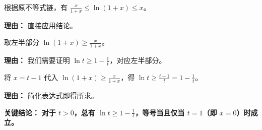 \begin{examplebox}
\begin{description}[style=nextline, leftmargin=2.8em, labelsep=0.5em, itemsep=0.45em]
    \item[\textbf{第二步（代入原式）：}] 根据原不等式链，有 $\frac{x}{1+x} \le \ln(1+x) \le x$。
    \par\textbf{理由：}
    直接应用结论。

    \item[\textbf{第三步（取下界部分）：}] 取左半部分 $\ln(1+x) \ge \frac{x}{1+x}$。
    \par\textbf{理由：}
    我们需要证明 $\ln t \ge 1 - \frac{1}{t}$，对应左半部分。

    \item[\textbf{第四步（换回变量）：}] 将 $x = t-1$ 代入 $\ln(1+x) \ge \frac{x}{1+x}$，得 $\ln t \ge \frac{t-1}{t} = 1 - \frac{1}{t}$。
    \par\textbf{理由：}
    简化表达式即得所求。
\end{description}

\textbf{\textcolor{CExample}{关键结论：}} \textbf{对于 $t > 0$，总有 $\ln t \ge 1 - \frac{1}{t}$，等号当且仅当 $t=1$（即 $x=0$）时成立。}
\end{examplebox}
